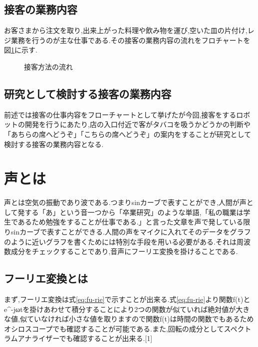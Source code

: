 \documentclass[12pt,oneside]{sotsuken_paper}
\begin{document}
\subsection{接客の業務内容}
お客さまから注文を取り,出来上がった料理や飲み物を運び,空いた皿の片付け,レジ業務を行うのが主な仕事である.その接客の業務内容の流れをフロチャートを図\ref{fig:customer-service}に示す.

\begin{figure}[htbp]
\scriptsize
{}
%
\caption{接客方法の流れ}
\label{fig:customer-service}%
\normalsize
\end{figure}


\subsection{研究として検討する接客の業務内容}
前述では接客の仕事内容をフローチャートとして挙げたが今回,接客をするロボットの開発を行うにあたり,店の入口付近で客がタバコを吸うかどうかの判断や「あちらの席へどうぞ」「こちらの席へどうぞ」の案内をすることが研究として検討する接客の業務内容となる.


\section{声とは}
声とは空気の振動であり波である.つまりsinカーブで表すことができ,人間が声として発する「あ」という音一つから「卒業研究」のような単語,「私の職業は学生であるため勉強をすることが仕事である.」と言った文章を声で発している限りsinカーブで表すことができる.人間の声をマイクに入れてそのデータをグラフのように近いグラフを書くためには特別な手段を用いる必要がある.それは周波数成分をチェックすることであり,音声にフーリエ変換を掛けることである.


\subsection{フーリエ変換とは}
まず,フーリエ変換は式\ref{eq:fu-rie}で示すことが出来る.式\ref{eq:fu-rie}より関数f(t)とe^{-jωt}を掛けあわせて積分することにより2つの関数が似ていれば絶対値が大きな値,似ていなければ小さな値を取りますので関数f(t)は時間の関数でもあるためオシロスコープでも確認することが可能である.また,回転の成分としてスペクトラムアナライザーでも確認することが出来る.[1]
\end{document}
